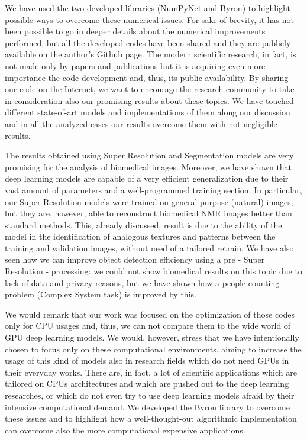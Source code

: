 \documentclass{standalone}
\begin{document}
We have used the two developed libraries (\textsf{NumPyNet} and \textsf{Byron}) to highlight possible ways to overcome these numerical issues.
For sake of brevity, it has not been possible to go in deeper details about the numerical improvements performed, but all the developed codes have been shared and they are publicly available on the author's Github page.
The modern scientific research, in fact, is not made only by papers and publications but it is acquiring even more importance the code development and, thus, its public availability.
By sharing our code on the Internet, we want to encourage the research community to take in consideration also our promising results about these topics.
We have touched different state-of-art models and implementations of them along our discussion and in all the analyzed cases our results overcome them with not negligible results.

The results obtained using Super Resolution and Segmentation models are very promising for the analysis of biomedical images.
Moreover, we have shown that deep learning models are capable of a very efficient generalization due to their vast amount of parameters and a well-programmed training section.
In particular, our Super Resolution models were trained on general-purpose (natural) images, but they are, however, able to reconstruct biomedical NMR images better than standard methods.
This, already discussed, result is due to the ability of the model in the identification of analogous textures and patterns between the training and validation images, without need of a tailored retrain.
We have also seen how we can improve object detection efficiency using a pre - Super Resolution - processing: we could not show biomedical results on this topic due to lack of data and privacy reasons, but we have shown how a people-counting problem (Complex System task) is improved by this.

We would remark that our work was focused on the optimization of those codes only for CPU usages and, thus, we can not compare them to the wide world of GPU deep learning models.
We would, however, stress that we have intentionally chosen to focus only on these computational environments, aiming to increase the usage of this kind of models also in research fields which do not need GPUs in their everyday works.
There are, in fact, a lot of scientific applications which are tailored on CPUs architectures and which are pushed out to the deep learning researches, or which do not even try to use deep learning models afraid by their intensive computational demand.
We developed the \textsf{Byron} library to overcome these issues and to highlight how a well-thought-out algorithmic implementation can overcome also the more computational expensive applications.
\end{document}
